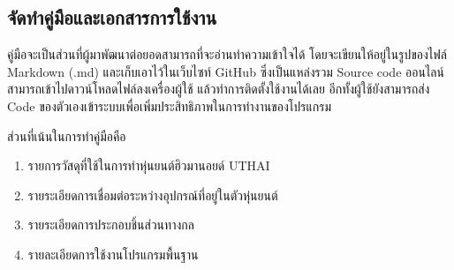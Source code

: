 



\clearpage
\subsection{จัดทำคู่มือและเอกสารการใช้งาน}
คู่มือจะเป็นส่วนที่ผู้มาพัฒนาต่อยอดสามารถที่จะอ่านทำความเข้าใจได้ โดยจะเขียนให้อยู่ในรูปของไฟล์ 
Markdown (.md) และเก็บเอาไว้ในเว็บไซท์ GitHub ซึ่งเป็นแหล่งรวม Source code ออนไลน์
สามารถเข้าไปดาวน์โหลดไฟล์ลงเครื่องผู้ใช้ แล้วทำการติดตั้งใช้งานได้เลย อีกทั้งผู้ใช้ยังสามารถส่ง Code
ของตัวเองเข้าระบบเพื่อเพิ่มประสิทธิภาพในการทำงานของโปรแกรม

ส่วนที่เน้นในการทำคู่มือคือ\vspace{-5mm}
\begin{enumerate}[label=\arabic*, leftmargin=1.5cm]\setlength\itemsep{-0.25em}
	\item รายการวัสดุที่ใช้ในการทำหุ่นยนต์ฮิวมานอยด์ UTHAI
	\item รายระเอียดการเชื่อมต่อระหว่างอุปกรณ์ที่อยู่ในตัวหุ่นยนต์
	\item รายระเอียดการประกอบชิ้นส่วนทางกล
	\item รายละเอียดการใช้งานโปรแกรมพื้นฐาน
\end{enumerate}

